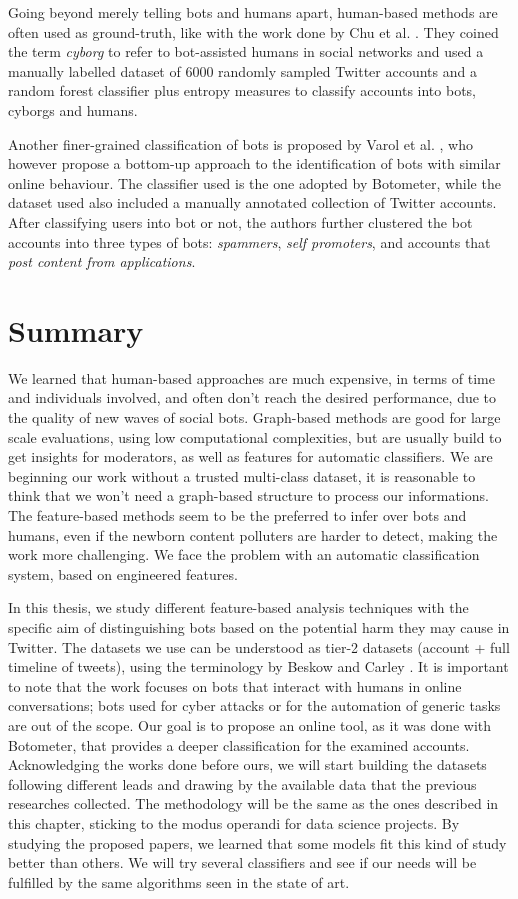 Going beyond merely telling bots and humans apart, human-based methods are often used as ground-truth, like with the work done by Chu et al. \cite{Cyborgs}. They coined the term \emph{cyborg} to refer to bot-assisted humans in social networks and used a manually labelled dataset of 6000 randomly sampled Twitter accounts and a random forest classifier plus entropy measures to classify accounts into bots, cyborgs and humans.

Another finer-grained classification of bots is proposed by Varol et al. \cite{Varol}, who however propose a bottom-up approach to the identification of bots with similar online behaviour. The classifier used is the one adopted by Botometer, while the dataset used also included a manually annotated collection of Twitter accounts. After classifying users into bot or not, the authors further clustered the bot accounts into three types of bots: \emph{spammers}, \textit{self promoters}, and accounts that \textit{post content from applications}.

\section{Summary}
We learned that human-based approaches are much expensive, in terms of time and individuals involved, and often don't reach the desired performance, due to the quality of new waves of social bots.
Graph-based methods are good for large scale evaluations, using low computational complexities, but are usually build to get insights for moderators, as well as features for automatic classifiers.
We are beginning our work without a trusted multi-class dataset, it is reasonable to think that we won't need a graph-based structure to process our informations.
The feature-based methods seem to be the preferred to infer over bots and humans, even if the newborn content polluters are harder to detect, making the work more challenging.
We face the problem with an automatic classification system, based on engineered features.

In this thesis, we study different feature-based analysis techniques with the specific aim of distinguishing bots based on the potential harm they may cause in Twitter. The datasets we use can be understood as tier-2 datasets (account + full timeline of tweets), using the terminology by Beskow and Carley \cite{Bot-Hunter}. It is important to note that the work focuses on bots that interact with humans in online conversations; bots used for cyber attacks or for the automation of generic tasks are out of the scope. Our goal is to propose an online tool, as it was done with Botometer, that provides a deeper classification for the examined accounts. Acknowledging the works done before ours, we will start building the datasets following different leads and drawing by the available data that the previous researches collected. The methodology will be the same as the ones described in this chapter, sticking to the modus operandi for data science projects.
By studying the proposed papers, we learned that some models fit this kind of study better than others. We will try several classifiers and see if our needs will be fulfilled by the same algorithms seen in the state of art.

